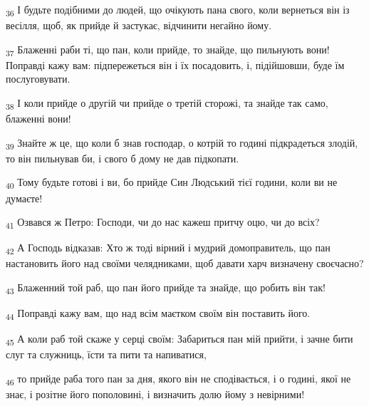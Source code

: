 \begin{tcolorbox}
\textsubscript{36} І будьте подібними до людей, що очікують пана свого, коли вернеться він із весілля, щоб, як прийде й застукає, відчинити негайно йому.
\end{tcolorbox}
\begin{tcolorbox}
\textsubscript{37} Блаженні раби ті, що пан, коли прийде, то знайде, що пильнують вони! Поправді кажу вам: підпережеться він і їх посадовить, і, підійшовши, буде їм послуговувати.
\end{tcolorbox}
\begin{tcolorbox}
\textsubscript{38} І коли прийде о другій чи прийде о третій сторожі, та знайде так само, блаженні вони!
\end{tcolorbox}
\begin{tcolorbox}
\textsubscript{39} Знайте ж це, що коли б знав господар, о котрій то годині підкрадеться злодій, то він пильнував би, і свого б дому не дав підкопати.
\end{tcolorbox}
\begin{tcolorbox}
\textsubscript{40} Тому будьте готові і ви, бо прийде Син Людський тієї години, коли ви не думаєте!
\end{tcolorbox}
\begin{tcolorbox}
\textsubscript{41} Озвався ж Петро: Господи, чи до нас кажеш притчу оцю, чи до всіх?
\end{tcolorbox}
\begin{tcolorbox}
\textsubscript{42} А Господь відказав: Хто ж тоді вірний і мудрий домоправитель, що пан настановить його над своїми челядниками, щоб давати харч визначену своєчасно?
\end{tcolorbox}
\begin{tcolorbox}
\textsubscript{43} Блаженний той раб, що пан його прийде та знайде, що робить він так!
\end{tcolorbox}
\begin{tcolorbox}
\textsubscript{44} Поправді кажу вам, що над всім маєтком своїм він поставить його.
\end{tcolorbox}
\begin{tcolorbox}
\textsubscript{45} А коли раб той скаже у серці своїм: Забариться пан мій прийти, і зачне бити слуг та служниць, їсти та пити та напиватися,
\end{tcolorbox}
\begin{tcolorbox}
\textsubscript{46} то прийде раба того пан за дня, якого він не сподівається, і о годині, якої не знає, і розітне його пополовині, і визначить долю йому з невірними!
\end{tcolorbox}
